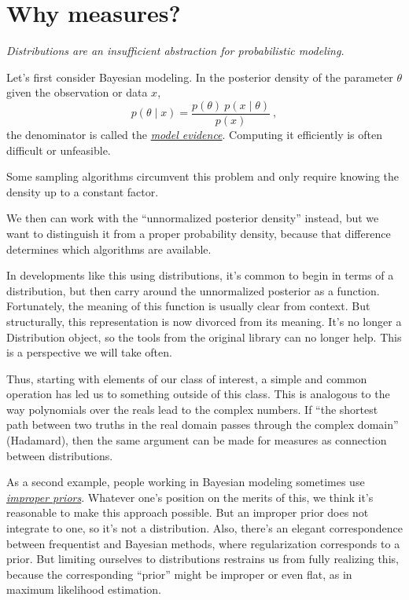 \documentclass{juliacon}
\begin{document}
\section{Why measures?}

\emph{Distributions are an insufficient abstraction for probabilistic modeling.}

Let's first consider Bayesian modeling. In the posterior density of the
parameter $\theta$ given the observation or data $x$,
\[
p(\theta \mid x) = \frac{p(\theta)\ p(x \mid \theta)}{p(x)}\ ,
\]
the denominator is called the \href{https://en.wikipedia.org/wiki/Marginal_likelihood}{\emph{model evidence}}. Computing it efficiently is often difficult or unfeasible.

Some sampling algorithms circumvent this problem and only require knowing the density up to a constant factor.

We then can work with the ``unnormalized posterior density'' instead, but we want to distinguish it from a proper probability density, because that difference determines which algorithms are available.


In developments like this using distributions, it's common to begin in terms of a distribution, but then carry around the unnormalized posterior as a function. Fortunately, the meaning of this function is usually clear from context. But structurally, this representation is now divorced from its meaning. It's no longer a Distribution object, so the tools from the original library can no longer help. This is a perspective we will take often.




Thus, starting with elements of our class of interest, a simple and common operation has led us to something outside of this class. This is analogous to the way polynomials over the reals lead to the complex numbers. If ``the shortest path between two truths in the real domain passes through the complex domain'' (Hadamard), then the same argument can be made for measures as connection between distributions.



As a second example, people working in Bayesian modeling sometimes use \href{https://en.wikipedia.org/wiki/Prior_probability#Improper_priors}{\emph{improper priors}}. Whatever one's position on the merits of this, we think it's reasonable to make this approach possible. But an improper prior does not integrate to one, so it's not a distribution.
Also, there's an elegant correspondence between frequentist and Bayesian methods, where regularization corresponds to a prior. But limiting ourselves to distributions restrains us from fully realizing this, because the corresponding ``prior'' might be improper or even flat, as in maximum likelihood estimation.
\end{document}
